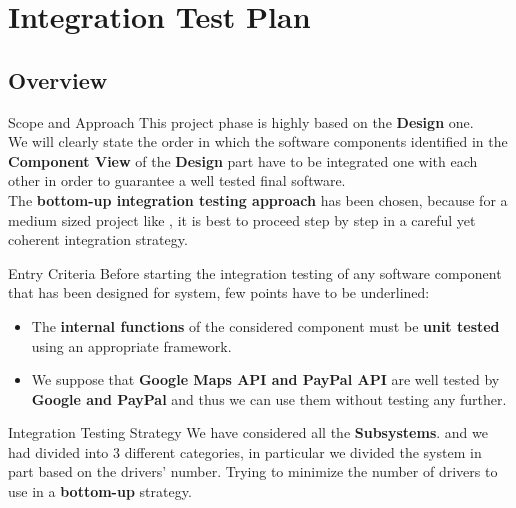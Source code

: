 \documentclass{../Common/Structure/pdf_presentation}
\begin{document}
	\section{Integration Test Plan}
	\subsection{Overview}
	\begin{frame}{Scope and Approach}
		This project phase is highly based on the \textbf{Design} one. \\
		\medskip
		We will clearly state the order in which the software components identified in the \textbf{Component View} of the \textbf{Design} part have to be integrated one with each other in order to guarantee a well tested final software.\\
		\medskip
		The \textbf{bottom-up integration testing approach} has been chosen, because for a medium sized project like \PowerEnJoy{}, it is best to proceed step by step in a careful yet coherent integration strategy.\\
	\end{frame}
	\begin{frame}{Entry Criteria}
		Before starting the integration testing of any software component that has been designed for \PowerEnJoy{} system, few points have to be underlined:
		\begin{itemize}
			 \item The \textbf{internal functions} of the considered component must be \textbf{unit tested} using an appropriate framework.
			 \item We suppose that \textbf{Google Maps API and PayPal API} are well tested by \textbf{Google and PayPal} and thus we can use them without testing any
			 further.
		\end{itemize}
	\end{frame}
	\begin{frame}{Integration Testing Strategy}
		We have considered all the \textbf{Subsystems}. and we had divided into 3 different categories, in particular we divided the system in part based on the drivers' number. Trying to minimize the number of drivers to use in a \textbf{bottom-up} strategy.\\
	\end{frame}
\end{document}

